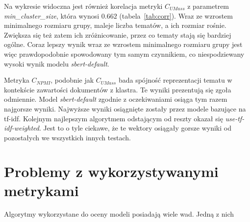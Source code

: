 	Na wykresie widoczna jest również korelacja metryki \(C_{UMass}\) z parametrem \emph{min\_cluster\_size}, która wynosi \(0.662\) (tabela~\ref{tab:corr}).
	Wraz ze wzrostem minimalnego rozmiaru grupy, maleje liczba tematów, a ich rozmiar rośnie.
	Zwiększa się też zatem ich zróżnicowanie, przez co tematy stają się bardziej ogólne.
	Coraz lepszy wynik wraz ze wzrostem minimalnego rozmiaru grupy jest więc prawdopodobnie spowodowany tym samym czynnikiem,
		co niespodziewany wysoki wynik modelu \emph{sbert-default}.

	Metryka \(C_{NPMI}\), podobnie jak \(C_{UMass}\) bada spójność reprezentacji tematu w kontekście zawartości dokumentów z klastra.
	Te wyniki prezentują się zgoła odmiennie.
	Model \emph{sbert-default} zgodnie z oczekiwaniami osiąga tym razem najgorsze wyniki.
	Najwyższe wyniki osiągnięte zostały przez modele bazujące na tf-idf.
	Kolejnym najlepszym algorytmem odstającym od reszty okazał się \emph{use-tf-idf-weighted}.
	Jest to o tyle ciekawe, że te wektory osiągały gorsze wyniki od pozostałych we wszystkich innych testach.

\section{Problemy z wykorzystywanymi metrykami}
	Algorytmy wykorzystane do oceny modeli posiadają wiele wad.
	Jedną z nich 